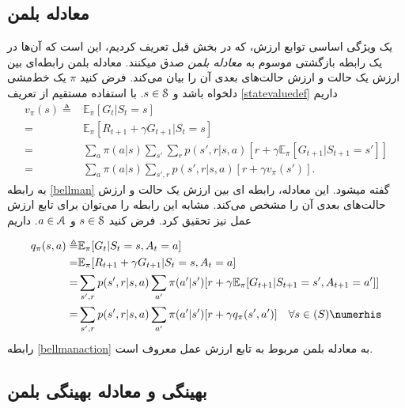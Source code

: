 \subsection{معادله بلمن}

یک ویژگی اساسی توابع ارزش، که در بخش قبل تعریف کردیم، این است که آن‌ها در یک رابطه بازگشتی موسوم به 
\textit{معادله بلمن} 
صدق می\nf کنند. معادله بلمن رابطه‌ای بین ارزش یک حالت و ارزش‌ حالت‌های بعدی آن را بیان می‌کند.
فرض کنید $\pi$ یک خط‌مشی دلخواه باشد و
 $s \in \EuScript{S}$.
  با استفاده مستقیم از تعریف
 \ref{statevaluedef}
 داریم
\begin{align}
v_\pi (s) \triangleq& \mathbb{E}_\pi [G_t | S_t = s] \nonumber \\
=& \mathbb{E}_\pi [R_{t+1}+ \gamma G_{t+1}|S_t=s] \nonumber \\
=&\sum_{a} \pi(a|s) \sum_{s'}\sum_{r} p(s',r|s,a)[r+\gamma \mathbb{E}_\pi[G_{t+1}|S_{t+1}=s']] \nonumber\\
=&\sum_{a} \pi(a|s) \sum_{s',r} p(s',r|s,a)[r+\gamma v_\pi(s')] %
\label{bellman}.
\end{align}
به رابطه 
 \ref{bellman}
 گفته می\nf شود. این معادله، رابطه ای بین ارزش یک حالت و ارزش حالت‌های بعدی آن را مشخص می‌کند. مشابه این رابطه را می‌توان برای تابع ارزش عمل نیز تحقیق کرد. فرض کنید 
$s \in \EuScript{S}$
 و 
 $a \in \EuScript{A}$.
 داریم
 
\begin{align}
q_\pi (s,a) \triangleq& \mathbb{E}_\pi [G_t | S_t = s, A_t = a] \nonumber \\
=& \mathbb{E}_\pi [R_{t+1}+ \gamma G_{t+1}|S_t=s, A_t = a] \nonumber \\
=&\sum_{s',r} p(s',r|s,a) \sum_{a'} \pi(a'|s')[r+\gamma \mathbb{E}_\pi[G_{t+1}|S_{t+1}=s', A_{t+1} = a']] \nonumber\\
=&\sum_{s',r}  p(s',r|s,a) \sum_{a'} \pi(a'|s')[r+\gamma q_\pi(s',a')] \quad \forall s \in \mathbb(S) \numerhis 
\label{bellmanaction}
\end{align}
رابطه \ref{bellmanaction} به معادله بلمن مربوط به تابع ارزش عمل معروف است.
\subsection{بهینگی و معادله بهینگی بلمن}

